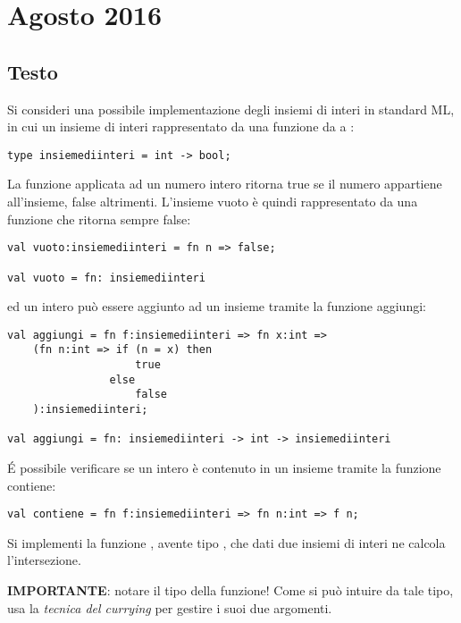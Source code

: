 \section{Agosto 2016}

\subsection{Testo}

Si consideri una possibile implementazione degli insiemi di interi in standard ML, in cui un insieme di interi rappresentato da una funzione da  a :
\begin{lstlisting}[style = SML, caption = {Definizione del tipo di dato \sml{insiemidiinteri}}]
type insiemediinteri = int -> bool;
\end{lstlisting}

La funzione applicata ad un numero intero ritorna true se il numero appartiene all'insieme, false altrimenti. L'insieme vuoto è quindi rappresentato da una funzione che ritorna sempre false:
\begin{lstlisting}[style = SML, caption = {Definizione della funzione \sml{vuoto}}]
val vuoto:insiemediinteri = fn n => false;

val vuoto = fn: insiemediinteri
\end{lstlisting}

ed un intero può essere aggiunto ad un insieme tramite la funzione aggiungi:
\begin{lstlisting}[style = SML, caption = {Definizione della funzione \sml{aggiungi}}]
val aggiungi = fn f:insiemediinteri => fn x:int =>
	(fn n:int => if (n = x) then
					true
				else
					false
	):insiemediinteri;

val aggiungi = fn: insiemediinteri -> int -> insiemediinteri
\end{lstlisting}

\'E possibile verificare se un intero è contenuto in un insieme tramite la funzione contiene:
\begin{lstlisting}[style = SML, caption = {Definizione della funzione \sml{contiene}}]
val contiene = fn f:insiemediinteri => fn n:int => f n;
\end{lstlisting}

Si implementi la funzione , avente tipo , che dati due insiemi di interi ne calcola l'intersezione.

\textbf{IMPORTANTE}: notare il tipo della funzione! Come si può intuire da tale tipo, usa la \emph{tecnica del currying} per gestire i suoi due argomenti.


